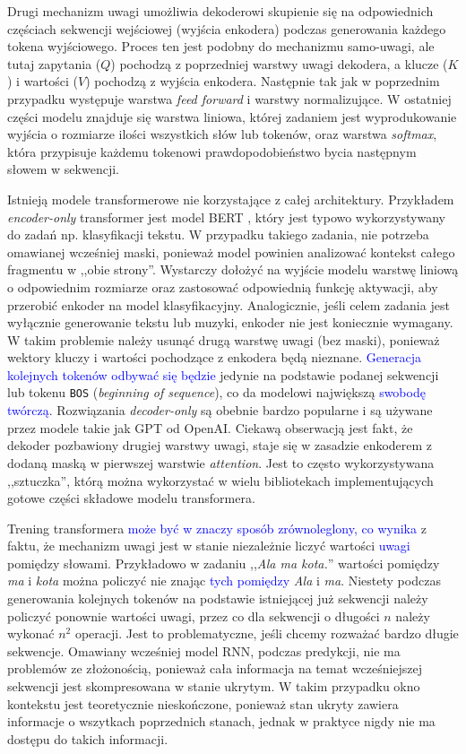 \documentclass[data-science]{agh-wi} %
\begin{document}
Drugi mechanizm uwagi umożliwia dekoderowi skupienie się na odpowiednich częściach sekwencji wejściowej (wyjścia enkodera) podczas generowania każdego tokena wyjściowego. Proces ten jest podobny do mechanizmu samo-uwagi, ale tutaj zapytania ($Q$) pochodzą z poprzedniej warstwy uwagi dekodera, a klucze ($K$) i wartości ($V$) pochodzą z wyjścia enkodera. Następnie tak jak w poprzednim przypadku występuje warstwa \textit{feed forward} i warstwy normalizujące. W ostatniej części modelu znajduje się warstwa liniowa, której zadaniem jest wyprodukowanie wyjścia o rozmiarze ilości wszystkich słów lub tokenów, oraz warstwa \textit{softmax}, która przypisuje każdemu tokenowi prawdopodobieństwo bycia następnym słowem w sekwencji.

Istnieją modele transformerowe nie korzystające z całej architektury. Przykładem \textit{encoder-only} transformer jest model BERT \cite{bert}, który jest typowo wykorzystywany do zadań np. klasyfikacji tekstu. W przypadku takiego zadania, nie potrzeba omawianej wcześniej maski, ponieważ model powinien analizować kontekst całego fragmentu w ,,obie strony''. Wystarczy dołożyć na wyjście modelu warstwę liniową o odpowiednim rozmiarze oraz zastosować odpowiednią funkcję aktywacji, aby przerobić enkoder na model klasyfikacyjny.
Analogicznie, jeśli celem zadania jest wyłącznie generowanie tekstu lub muzyki, enkoder nie jest koniecznie wymagany. W takim problemie należy usunąć drugą warstwę uwagi (bez maski), ponieważ wektory kluczy i wartości pochodzące z enkodera będą nieznane. \textcolor{blue}{Generacja kolejnych tokenów odbywać się będzie} jedynie na podstawie podanej sekwencji lub tokenu \texttt{BOS} (\textit{beginning of sequence}), co da modelowi największą \textcolor{blue}{swobodę twórczą}. Rozwiązania \textit{decoder-only} są obebnie bardzo popularne i są używane przez modele takie jak GPT od OpenAI. Ciekawą obserwacją jest fakt, że dekoder pozbawiony drugiej warstwy uwagi, staje się w zasadzie enkoderem z dodaną maską w pierwszej warstwie \textit{attention}. Jest to często wykorzystywana ,,sztuczka'', którą można wykorzystać w wielu bibliotekach implementujących gotowe części składowe modelu transformera.

Trening transformera \textcolor{blue}{może być w znaczy sposób zrównoleglony, co wynika} z faktu, że mechanizm uwagi jest w stanie niezależnie liczyć wartości \textcolor{blue}{uwagi} pomiędzy słowami. Przykładowo w zadaniu ,,\textit{Ala ma kota.}'' wartości pomiędzy \textit{ma} i \textit{kota} można policzyć nie znając \textcolor{blue}{tych pomiędzy} \textit{Ala} i \textit{ma}. Niestety podczas generowania kolejnych tokenów na podstawie istniejącej już sekwencji należy policzyć ponownie wartości uwagi, przez co dla sekwencji o długości $n$ należy wykonać $n^2$ operacji. Jest to problematyczne, jeśli chcemy rozważać bardzo długie sekwencje. Omawiany wcześniej model RNN, podczas predykcji, nie ma problemów ze złożonością, ponieważ cała informacja na temat wcześniejszej sekwencji jest skompresowana w stanie ukrytym. W takim przypadku okno kontekstu jest teoretycznie nieskończone, ponieważ stan ukryty zawiera informacje o wszytkach poprzednich stanach, jednak w praktyce nigdy nie ma dostępu do takich informacji.
\end{document}
